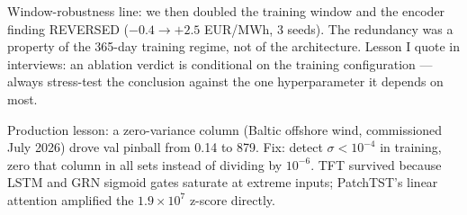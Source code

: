 Window-robustness line: we then doubled the training window and the
encoder finding REVERSED ($-0.4 \to +2.5$ EUR/MWh, 3 seeds). The
redundancy was a property of the 365-day training regime, not of the
architecture. Lesson I quote in interviews: an ablation verdict is
conditional on the training configuration --- always stress-test the
conclusion against the one hyperparameter it depends on most.

Production lesson: a zero-variance column (Baltic offshore wind,
commissioned July 2026) drove val pinball from 0.14 to 879.
Fix: detect $\sigma < 10^{-4}$ in training, zero that column in all
sets instead of dividing by $10^{-6}$. TFT survived because LSTM and
GRN sigmoid gates saturate at extreme inputs; PatchTST's linear attention
amplified the $1.9 \times 10^7$ z-score directly.
